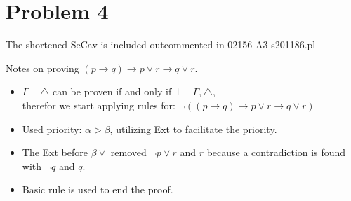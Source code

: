 \newpage
\section*{Problem 4}
The shortened SeCav is included outcommented in 02156-A3-s201186.pl

Notes on proving $(p \to q) \to p \lor r \to q \lor r$.
\begin{itemize}
    \item $\Gamma \vdash \triangle$ can be proven if and only if $\vdash \neg \Gamma, \triangle$, \\ therefor we start applying rules for: $\neg((p \to q) \to p \lor r \to q \lor r)$  
    \item Used priority: $\alpha > \beta$, utilizing Ext to facilitate the priority. 
    \item The Ext before $\beta \lor$ removed $\neg p \lor r$ and $r$ because a contradiction is found with $\neg q$ and $q$. 
    \item Basic rule is used to end the proof.
\end{itemize}